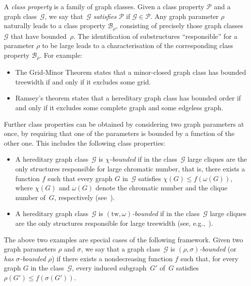 \documentclass[11pt]{article}
\newcommand{\tw}{\mathrm{tw}}
\theoremstyle{plain}
\theoremstyle{definition}
\theoremstyle{remark}
\numberwithin{equation}{section}
\begin{document}
A \emph{class property} is a family of graph classes. 
Given a class property $\mathcal{P}$ and a graph class~$\mathcal{G}$, we say that~$\mathcal{G}$ \emph{satisfies} $\mathcal{P}$ if $\mathcal{G}\in \mathcal{P}$.
Any graph parameter $\rho$ naturally leads to a class property $\mathcal{B}_\rho$, consisting of precisely those graph classes~$\mathcal{G}$ that have bounded~$\rho$.
The identification of substructures ``responsible'' for a parameter $\rho$ to be large leads to a characterisation of the corresponding class property $\mathcal{B}_\rho$.
For example:
\begin{itemize}
\item The Grid-Minor Theorem states that a minor-closed graph class has bounded treewidth if and only if it excludes some grid.
\item Ramsey's theorem states that a hereditary graph class has bounded order if and only if it excludes some complete graph and some edgeless graph.
\end{itemize}

\medskip
{} 
Further class properties can be obtained by considering two graph parameters at once, by requiring that one of the parameters is bounded by a function of the other one.
This includes the following class properties:
\begin{itemize}
    \item A hereditary graph class~$\mathcal{G}$ is \emph{$\chi$-bounded} if in the class~$\mathcal{G}$ large cliques are the only structures responsible for large chromatic number, that is, there exists a function $f$ such that every graph $G$ in~$\mathcal{G}$ satisfies $\chi(G)\le f(\omega(G))$, where $\chi(G)$ and $\omega(G)$ denote the chromatic number and the clique number of~$G$, respectively (see~\cite{MR0951359}).
\item A hereditary graph class~$\mathcal{G}$ is \emph{$(\tw,\omega)$-bounded} if in the class~$\mathcal{G}$ large cliques are the only structures responsible for large treewidth (see, e.g.,~\cite{MR4334541,MR4332111}).
\end{itemize}
The above two examples are special cases of the following framework.
Given two graph parameters $\rho$ and $\sigma$, we say that a graph class~$\mathcal{G}$ is \emph{$(\rho,\sigma)$-bounded} (or \emph{has $\sigma$-bounded $\rho$}) if there exists a nondecreasing function $f$ such that, for every graph $G$ in the class~$\mathcal{G}$, every induced subgraph~$G'$ of~$G$ satisfies $\rho(G')\le f(\sigma(G'))$.
\end{document}
